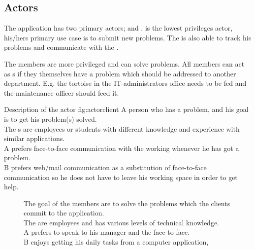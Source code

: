 \subsection{Actors}
\label{sec:actors}

The application has two primary actors; \aclient{} and \astaff. \aclient[c] is the lowest privileges actor, his/hers primary use case is to submit new problems.
The \aclient[] is also able to track his problems and communicate with the \astaff[]. 

The \astaff[] members are more privileged and can solve problems. 
All \astaff[] members can act as \aclient[]s if they themselves have a problem which should be addressed to another department. 
E.g. the tortoise in the IT-administrators office needs to be fed and the maintenance officer should feed it. 


\begin{sadlist}[h]{\Aclient}{Description of the actor \aclient}{fig:actorclient}
 A person who has a problem, and his goal is to get his problem(s) solved. \\
 The \aclient{}s are employees or students with different knowledge and experience with similar applications. \\%
 \Aclient{} A prefers face-to-face communication with the working \astaff{} whenever he has got a problem.\\
\aclient[c] B prefers web/mail communication as a substitution of face-to-face communication so he does not have to leave his working space in order to get help. 
\end{sadlist} 

\begin{figure}[H]
\begin{sadlistar}{\Astaff}
 The goal of the \astaff[] members are to solve the problems which the clients commit to the application. \\
 The \astaff[] are employees and has various levels of technical knowledge. \\
 \astaff[c] A prefers to speak to his manager and the \aclient[] face-to-face.\\
\astaff[c] B enjoys getting his daily tasks from a computer application, 
 \end{sadlistar}
 \caption{}
 \label{fig:actorstaff}
 \end{figure}



